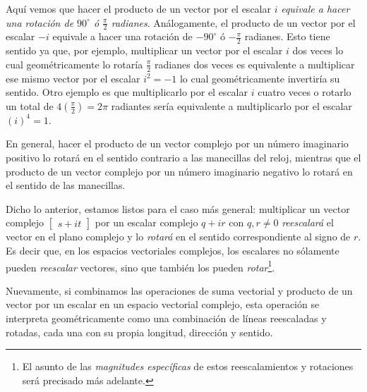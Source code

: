 \documentclass[12pt]{article}
\begin{document}
Aquí vemos que hacer el producto de un vector por el escalar $i$ \emph{equivale a hacer una rotación de $90^\circ$ ó $\frac{\pi}{2}$ radianes}. Análogamente, el producto de un vector por el escalar $-i$ equivale a hacer una rotación de $-90^\circ$ ó $-\frac{\pi}{2}$ radianes. Esto tiene sentido ya que, por ejemplo, multiplicar un vector por el escalar $i$ dos veces \textemdash lo cual geométricamente lo rotaría $\frac{\pi}{2}$ radianes dos veces\textemdash\hspace{0.5mm} es equivalente a multiplicar ese mismo vector por el escalar $i^2=-1$ \textemdash lo cual geométricamente invertiría su sentido. Otro ejemplo es que multiplicarlo por el escalar $i$ cuatro veces \textemdash o rotarlo un total de $4(\frac{\pi}{2})=2\pi$ radiantes\textemdash\hspace{0.5mm} sería equivalente a multiplicarlo por el escalar $(i)^4=1$.


En general, hacer el producto de un vector complejo por un número imaginario positivo lo rotará en el sentido contrario a las manecillas del reloj, mientras que el producto de un vector complejo por un número imaginario negativo lo rotará en el sentido de las manecillas.

Dicho lo anterior, estamos listos para el caso más general: multiplicar un vector complejo $\begin{bmatrix}s+it\end{bmatrix}$ por un escalar complejo $q+ir$ con $q,r\neq0$ \emph{reescalará} el vector en el plano complejo y lo \emph{rotará} en el sentido correspondiente al signo de $r$. Es decir que, en los espacios vectoriales complejos, los escalares no sólamente pueden \emph{reescalar} vectores, sino que también los pueden \emph{rotar}\footnote{El asunto de las \emph{magnitudes específicas} de estos reescalamientos y rotaciones será precisado más adelante.}.


Nuevamente, si combinamos las operaciones de suma vectorial y producto de un vector por un escalar en un espacio vectorial complejo, esta operación se interpreta geométricamente como una combinación de líneas reescaladas y rotadas, cada una con su propia longitud, dirección y sentido.
\end{document}
